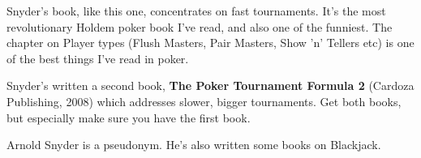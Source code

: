 Snyder's book, like this one, concentrates on fast tournaments. It's
the most revolutionary Holdem poker book I've read, and also one of
the funniest. The chapter on Player types (Flush Masters, Pair Masters,
Show 'n' Tellers etc) is one of the best things I've read in poker.

Snyder's written a second book, \textbf{The Poker Tournament Formula 2}
(Cardoza Publishing, 2008) which addresses slower, bigger
tournaments. Get both books, but especially make sure you have the
first book.

Arnold Snyder is a pseudonym. He's also written some books on Blackjack.
